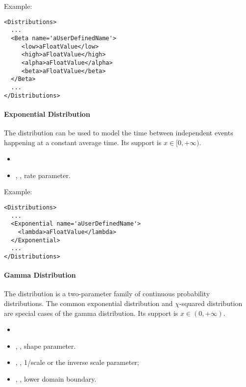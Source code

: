 Example:
\begin{lstlisting}[style=XML]
<Distributions>
  ...
  <Beta name='aUserDefinedName'>
     <low>aFloatValue</low>
     <high>aFloatValue</high>
     <alpha>aFloatValue</alpha>
     <beta>aFloatValue</beta>
  </Beta>
  ...
</Distributions>
\end{lstlisting}

\paragraph{Exponential Distribution}
\label{Exponential}
The  distribution  can be
used to model the time between independent events happening at a constant
average time.
%
Its support is $x \in [0, +\infty)$.

%
\attrIntro
\vspace{-5mm}
\begin{itemize}
\itemsep0em
\item \nameDescription
\end{itemize}
\vspace{-5mm}
\subnodeIntro
\begin{itemize}
\item {}, , rate parameter.
\end{itemize}

Example:
\begin{lstlisting}[style=XML]
<Distributions>
  ...
  <Exponential name='aUserDefinedName'>
    <lambda>aFloatValue</lambda>
  </Exponential>
  ...
</Distributions>
\end{lstlisting}

\paragraph{Gamma Distribution}
\label{Gamma}
The  distribution is a two-parameter family of continuous
probability distributions.
%
The common exponential distribution and $\chi$-squared distribution are special
cases of the gamma distribution.
%
Its support is $x \in (0,+\infty)$.

%
\attrIntro
\vspace{-5mm}
\begin{itemize}
\itemsep0em
\item \nameDescription
\end{itemize}
\vspace{-5mm}
\subnodesIntro
\begin{itemize}
\item {}, , shape parameter.
\item {}, , 1/scale or the
  inverse scale parameter;
\item {}, ,  lower domain
boundary.
\end{itemize}


